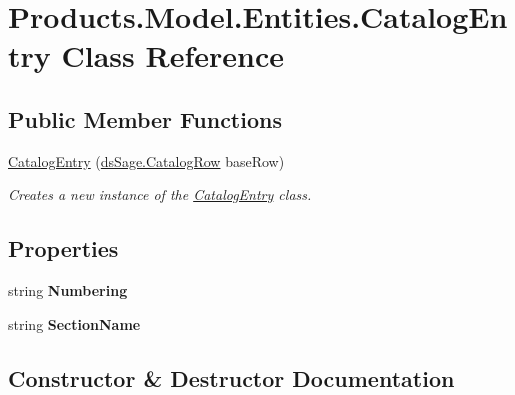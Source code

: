 \hypertarget{class_products_1_1_model_1_1_entities_1_1_catalog_entry}{}\section{Products.\+Model.\+Entities.\+Catalog\+Entry Class Reference}
\label{class_products_1_1_model_1_1_entities_1_1_catalog_entry}
\subsection*{Public Member Functions}
\begin{DoxyCompactItemize}
\item 
\hyperlink{class_products_1_1_model_1_1_entities_1_1_catalog_entry_ac081bb59c821dee1cc404bc65971fb08}{Catalog\+Entry} (\hyperlink{class_products_1_1_data_1_1ds_sage_1_1_catalog_row}{ds\+Sage.\+Catalog\+Row} base\+Row)
\begin{DoxyCompactList}\small\item\em Creates a new instance of the \hyperlink{class_products_1_1_model_1_1_entities_1_1_catalog_entry}{Catalog\+Entry} class. \end{DoxyCompactList}\end{DoxyCompactItemize}
\subsection*{Properties}
\begin{DoxyCompactItemize}
\item 
string {\bfseries Numbering}\hypertarget{class_products_1_1_model_1_1_entities_1_1_catalog_entry_a6ed1ea6ae2c436905843fe12e6426150}{}\label{class_products_1_1_model_1_1_entities_1_1_catalog_entry_a6ed1ea6ae2c436905843fe12e6426150}

\item 
string {\bfseries Section\+Name}\hypertarget{class_products_1_1_model_1_1_entities_1_1_catalog_entry_a8966100e55bd996faa3ccde476f70f9d}{}\label{class_products_1_1_model_1_1_entities_1_1_catalog_entry_a8966100e55bd996faa3ccde476f70f9d}

\end{DoxyCompactItemize}


\subsection{Constructor \& Destructor Documentation}
